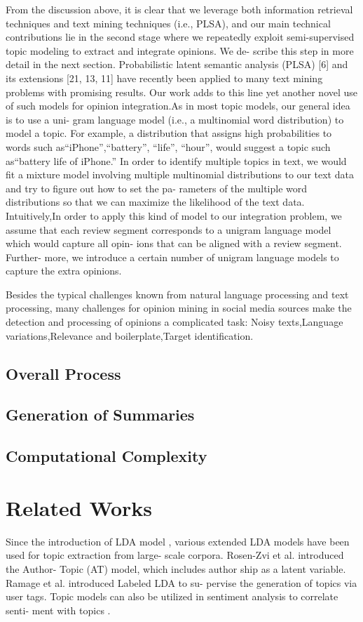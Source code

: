 \documentclass[runningheads,a4paper]{llncs}
\begin{document}
{From the discussion above, it is clear that we leverage both
information retrieval techniques and text mining techniques (i.e., PLSA), and our main technical contributions lie in the second stage where we repeatedly exploit semi-supervised topic modeling to extract and integrate opinions. We de- scribe this step in more detail in the next section.
Probabilistic latent semantic analysis (PLSA) [6] and its
extensions [21, 13, 11] have recently been applied to many text mining problems with promising results. Our work adds to this line yet another novel use of such models for opinion integration.As in most topic models, our general idea is to use a uni-
gram language model (i.e., a multinomial word distribution) to model a topic. For example, a distribution that assigns high probabilities to words such as“iPhone”,“battery”, “life”, “hour”, would suggest a topic such as“battery life of iPhone.” In order to identify multiple topics in text, we would fit a mixture model involving multiple multinomial distributions to our text data and try to figure out how to set the pa- rameters of the multiple word distributions so that we can maximize the likelihood of the text data. Intuitively,In order to apply this kind of model to our integration
problem, we assume that each review segment corresponds to a unigram language model which would capture all opin- ions that can be aligned with a review segment. Further- more, we introduce a certain number of unigram language models to capture the extra opinions.

Besides the typical challenges known from natural language processing and text processing, many challenges for opinion mining in social media sources make the detection and processing of opinions a complicated task: Noisy texts,Language variations,Relevance and boilerplate,Target identification.\cite{}
\subsection{Overall Process}

\subsection{Generation of Summaries}

\subsection{Computational Complexity}

\section{Related Works}
Since the introduction of LDA model \cite{blei2003latent}, various extended LDA models have been used for topic extraction from large- scale corpora. Rosen-Zvi et al. \cite{rosen2004author} introduced the Author- Topic (AT) model, which includes author ship as a latent variable. Ramage et al. \cite{ramage2009labeled} introduced Labeled LDA to su- pervise the generation of topics via user tags. Topic models can also be utilized in sentiment analysis to correlate senti- ment with topics \cite{mei2007topic}.

}
\end{document}
